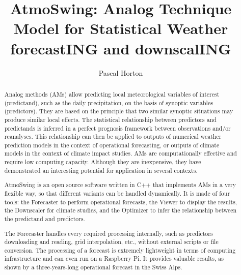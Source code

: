 \documentclass[review]{elsarticle}
\begin{document}
\begin{frontmatter}
	
	\title{AtmoSwing: Analog Technique Model for Statistical Weather forecastING and downscalING}
	
	
	\author[unibe,unil,terranum]{Pascal Horton}
	
	
	\address[unibe]{University of Bern, Oeschger Centre for Climate Change Research, Institute of Geography, Bern, Switzerland}
	\address[unil]{University of Lausanne, Institute of Earth Sciences, Lausanne, Switzerland}
	\address[terranum]{Terranum SARL, Bussigny, Switzerland}
	
	
	
	\begin{abstract}
		Analog methods (AMs) allow predicting local meteorological variables of interest (predictand), such as the daily precipitation, on the basis of synoptic variables (predictors). They are based on the principle that two similar synoptic situations may produce similar local effects. The statistical relationship between predictors and predictands is inferred in a perfect prognosis framework between observations and/or reanalyses. This relationship can then be applied to outputs of numerical weather prediction models in the context of operational forecasting, or outputs of climate models in the context of climate impact studies. AMs are computationally effective and require low computing capacity. Although they are inexpensive, they have demonstrated an interesting potential for application in several contexts. 
		
		AtmoSwing is an open source software written in C++ that implements AMs in a very flexible way, so that different variants can be handled dynamically. It is made of four tools: the Forecaster to perform operational forecasts, the Viewer to display the results, the Downscaler for climate studies, and the Optimizer to infer the relationship between the predictand and predictors. 
		
		The Forecaster handles every required processing internally, such as predictors downloading and reading, grid interpolation, etc., without external scripts or file conversion. The processing of a forecast is extremely lightweight in terms of computing infrastructure and can even run on a Raspberry Pi. It provides valuable results, as shown by a three-years-long operational forecast in the Swiss Alps. 
		

\end{abstract}
\end{frontmatter}
\end{document}
